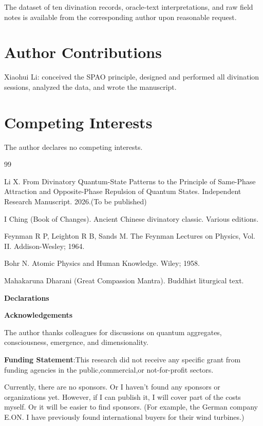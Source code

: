 \documentclass[11pt,a4paper]{article}
\begin{document}
The dataset of ten divination records, oracle-text interpretations, and raw field notes is available from the corresponding author upon reasonable request.

\section*{Author Contributions}

Xiaohui Li: conceived the SPAO principle, designed and performed all divination sessions, analyzed the data, and wrote the manuscript.

\section*{Competing Interests}

The author declares no competing interests.


\begin{thebibliography}{99}

Li X. From Divinatory Quantum-State Patterns to the Principle of Same-Phase Attraction and Opposite-Phase Repulsion of Quantum States. Independent Research Manuscript. 2026.(To be published)

I Ching (Book of Changes). Ancient Chinese divinatory classic. Various editions.

Feynman R P, Leighton R B, Sands M. The Feynman Lectures on Physics, Vol. II. Addison-Wesley; 1964.

Bohr N. Atomic Physics and Human Knowledge. Wiley; 1958.

Mahakaruna Dharani (Great Compassion Mantra). Buddhist liturgical text.

\end{thebibliography}
\textbf{\textbf{Declarations}}

  \textbf{\textbf{Acknowledgements}}

The author thanks colleagues for discussions on quantum aggregates, consciousness, emergence, and dimensionality. 

 \textbf{\textbf{Funding Statement}}:This research did not receive any specific grant from funding agencies in the public,commercial,or not-for-profit sectors.

Currently, there are no sponsors. Or I haven't found any sponsors or organizations yet. However, if I can publish it, I will cover part of the costs myself. Or it will be easier to find sponsors. (For example, the German company E.ON. I have previously found international buyers for their wind turbines.)
\end{document}
